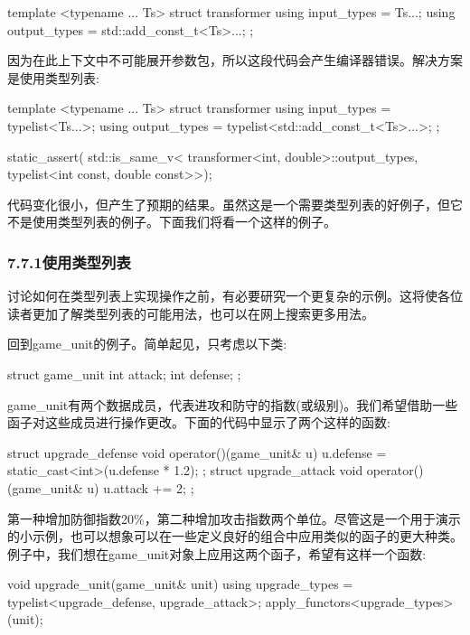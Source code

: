 \begin{cpp}
template <typename ... Ts>
struct transformer
{
	using input_types = Ts...;
	using output_types = std::add_const_t<Ts>...;
};
\end{cpp}

因为在此上下文中不可能展开参数包，所以这段代码会产生编译器错误。解决方案是使用类型列表:

\begin{cpp}
template <typename ... Ts>
struct transformer
{
	using input_types = typelist<Ts...>;
	using output_types = typelist<std::add_const_t<Ts>...>;
};

static_assert(
	std::is_same_v<
		transformer<int, double>::output_types,
		typelist<int const, double const>>);
\end{cpp}

代码变化很小，但产生了预期的结果。虽然这是一个需要类型列表的好例子，但它不是使用类型列表的例子。下面我们将看一个这样的例子。

\subsubsection{7.7.1\hspace{0.2cm}使用类型列表}

讨论如何在类型列表上实现操作之前，有必要研究一个更复杂的示例。这将使各位读者更加了解类型列表的可能用法，也可以在网上搜索更多用法。

回到game\_unit的例子。简单起见，只考虑以下类:

\begin{cpp}
struct game_unit
{
	int attack;
	int defense;
};
\end{cpp}

game\_unit有两个数据成员，代表进攻和防守的指数(或级别)。我们希望借助一些函子对这些成员进行操作更改。下面的代码中显示了两个这样的函数:

\begin{cpp}
struct upgrade_defense
{
	void operator()(game_unit& u)
	{
		u.defense = static_cast<int>(u.defense * 1.2);
	}
};
struct upgrade_attack
{
	void operator()(game_unit& u)
	{
		u.attack += 2;
	}
};
\end{cpp}

第一种增加防御指数20\%，第二种增加攻击指数两个单位。尽管这是一个用于演示的小示例，也可以想象可以在一些定义良好的组合中应用类似的函子的更大种类。例子中，我们想在game\_unit对象上应用这两个函子，希望有这样一个函数:

\begin{cpp}
void upgrade_unit(game_unit& unit)
{
	using upgrade_types =
		typelist<upgrade_defense, upgrade_attack>;
	apply_functors<upgrade_types>{}(unit);
}
\end{cpp}

